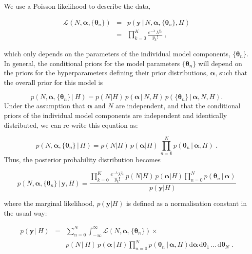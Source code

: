 \documentclass[12pt]{emulateapj}
\newcommand{\given}{\,|\,}
\newcommand{\dd}{\mathrm{d}}
\newcommand{\counts}{y}
\newcommand{\likelihood}{{\mathcal L}}
\begin{document}
We use a Poisson likelihood to describe the data,

\begin{eqnarray}
\likelihood(N, \bm{\alpha}, \{\bm{\theta}_n \}) & = & p(\bm{\counts} \given N, \bm{\alpha}, \{\bm{\theta}_n \}, H) \\ \nonumber
 &= & \prod\limits_{k=0}^{K}{ \frac{e^{-\lambda}\, \lambda^{y_k} }{y_k! }} \; ,
\end{eqnarray}

which only depends on the parameters of the individual model components, $\{\bm{\theta}_n\}$. In general, the conditional priors for the model 
parameters $\{\bm{\theta}_n\}$ will depend on the priors for the hyperparameters defining their prior distributions, $\bm{\alpha}$, such that the
overall prior for this model is

\begin{equation}
p(N, \bm{\alpha}, \{\bm{\theta}_n \} \given H) = p(N | H)\,p(\bm{\alpha}\given N, H)\,p(\{\bm{\theta}_n\}\given \bm{\alpha}, N, H)  .
\end{equation}
Under the assumption that $\bm{\alpha}$ and $N$ are independent, and that the conditional priors of the individual model components are
independent and identically distributed, we can re-write this equation as:

\begin{equation}
p(N, \bm{\alpha}, \{\bm{\theta}_n \} \given H) = p(N|H)\, p(\bm{\alpha}|H)\, \prod\limits_{n=0}^{N}  p(\bm{\theta}_n\given \bm{\alpha}, H) \; .
\end{equation}
Thus, the posterior probability distribution becomes

\begin{equation}
p(N, \bm{\alpha}, \{\bm{\theta}_n \}  \given \bm{\counts}, H) =  \frac{\prod\limits_{k=0}^{K}{ \frac{e^{-\lambda} \lambda^{y_k} }{y_k! }}\, p(N|H)\, p(\bm{\alpha}|H) \prod\limits_{n=0}^{N}  p(\bm{\theta}_n\given \bm{\alpha})}{p(\bm{\counts} | H)}
\end{equation}

where the marginal likelihood, $p(\bm{\counts} | H)$ is defined as a normalisation constant in the usual way: 

\begin{eqnarray}
p(\bm{\counts} \given H) & = & \sum_{n=0}^{N} \int_{-\infty}^{\infty}{\likelihood(N, \bm{\alpha}, \{\bm{\theta}_n \})} \times \\ \nonumber
&& p(N\given H)\, p(\bm{\alpha} \given H) \prod\limits_{n=0}^{N}  p(\bm{\theta}_n\given \bm{\alpha}, H) \dd\bm{\alpha}\, \dd\bm{\theta}_1 \, ...\, \dd\bm{\theta}_N \; .
\label{eqn:marginal}
\end{eqnarray}
\end{document}
